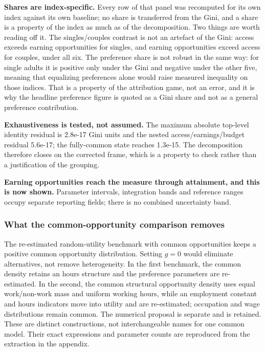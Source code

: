 \documentclass[11pt,a4paper]{article}
\begin{document}
\textbf{Shares are index-specific.} Every row of that panel was recomputed for its own index against its own baseline; no share is transferred from the Gini, and a share is a property of the index as much as of the decomposition. Two things are worth reading off it. The singles/couples contrast is not an artefact of the Gini: access exceeds earning opportunities for singles, and earning opportunities exceed access for couples, under all six. The preference share is not robust in the same way: for single adults it is positive only under the Gini and negative under the other five, meaning that equalizing preferences alone would raise measured inequality on those indices. That is a property of the attribution game, not an error, and it is why the headline preference figure is quoted as a Gini share and not as a general preference contribution.

\textbf{Exhaustiveness is tested, not assumed.} The maximum absolute top-level identity residual is 2.8e-17 Gini units and the nested access/earnings/budget residual 5.6e-17; the fully-common state reaches 1.3e-15. The decomposition therefore closes on the corrected frame, which is a property to check rather than a justification of the grouping.

\textbf{Earning opportunities reach the measure through attainment, and this is now shown.} Parameter intervals, integration bands and reference ranges occupy separate reporting fields; there is no combined uncertainty band.

\subsubsection{What the common-opportunity comparison removes}\label{what-the-common-opportunity-comparison-removes}

The re-estimated random-utility benchmark with common opportunities keeps a positive common opportunity distribution. Setting \(g=0\) would eliminate alternatives, not remove heterogeneity. In the first benchmark, the common density retains an hours structure and the preference parameters are re-estimated. In the second, the common structural opportunity density uses equal work/non-work mass and uniform working hours, while an employment constant and hours indicators move into utility and are re-estimated; occupation and wage distributions remain common. The numerical proposal is separate and is retained. These are distinct constructions, not interchangeable names for one common model. Their exact expressions and parameter counts are reproduced from the extraction in the appendix.
\end{document}
